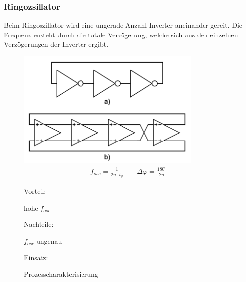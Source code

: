 \FloatBarrier
\subsubsection{Ringozsillator}
Beim Ringoszillator wird eine ungerade Anzahl Inverter aneinander gereit. Die Frequenz ensteht durch die totale Verzögerung, welche sich aus den einzelnen Verzögerungen der Inverter ergibt.
\begin{figure}[h!]
	\begin{minipage}{0.4\textwidth} 
	\includegraphics[width=0.8\textwidth]{images/Ring_Osc}
	\begin{equation*} 
        \begin{split} 
          f_{osc} =\frac{1}{2n\cdot t_g} \quad \quad \Delta\varphi =\frac{180^\circ}{2n}   
        \end{split} 
      \end{equation*}
	\end{minipage}
	\begin{minipage}{0.5\textwidth}
	  \begin{compactitem}
        \item Vorteil:
        \begin{compactitem}
           \item hohe $f_{osc}$ 
        \end{compactitem}
        \item Nachteile:
        \begin{compactitem}
           \item $f_{osc}$ ungenau
        \end{compactitem}
        \item Einsatz:
        \begin{compactitem}
           \item Prozesscharakterisierung

\end{compactitem}
\end{compactitem}
\end{minipage}
\end{figure}
